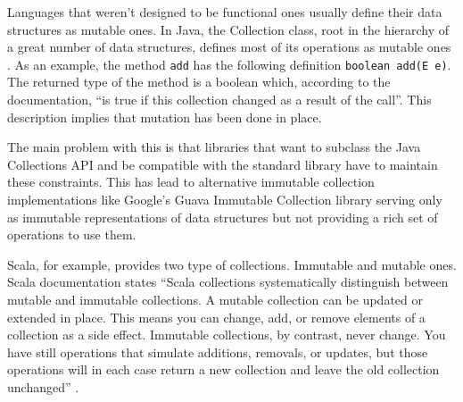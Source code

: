 \documentclass[../main.tex]{subfiles}
\begin{document}
Languages that weren't designed to be functional ones usually define their data
structures as mutable ones. In Java, the Collection class, root in the hierarchy
of a great number of data structures, defines most of its operations as mutable ones
\autocite{Collection}. As an example, the method \texttt{add} has the following definition
\texttt{boolean add(E e)}. The returned type of the method is a boolean which,
according to the documentation, ``is true if this collection changed as a result
of the call''. This description implies that mutation has been done in place.

The main problem with this is that libraries that want to subclass the Java
Collections API and be compatible with the standard library have to maintain
these constraints. This has lead to alternative immutable collection implementations like
Google's Guava Immutable Collection library \autocite{ImmutableCollectionAPI}
serving only as immutable representations of data structures but not providing a
rich set of operations to use them.

Scala, for example, provides two type of collections. Immutable and mutable ones.
Scala documentation states ``Scala collections systematically distinguish between
mutable and immutable collections. A mutable collection can be updated or
extended in place. This means you can change, add, or remove elements of a
collection as a side effect. Immutable collections, by contrast, never change.
You have still operations that simulate additions, removals, or updates, but
those operations will in each case return a new collection and leave the old
collection unchanged'' \autocite{MutableDocumentation}.
\end{document}
